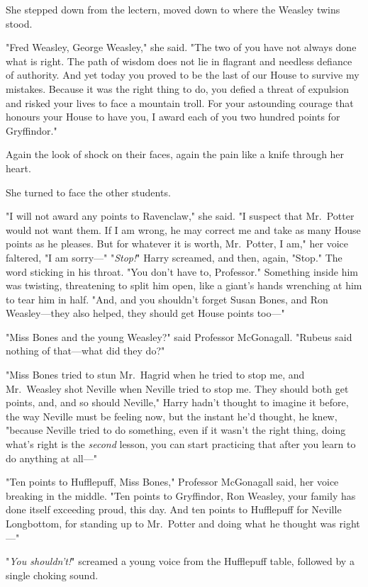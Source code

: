 She stepped down from the lectern, moved down to where the Weasley twins stood.

"Fred Weasley, George Weasley," she said. "The two of you have not always done
what is right. The path of wisdom does not lie in flagrant and needless
defiance of authority. And yet today you proved to be the last of our House to
survive my mistakes. Because it was the right thing to do, you defied a threat
of expulsion and risked your lives to face a mountain troll. For your
astounding courage that honours your House to have you, I award each of you two
hundred points for Gryffindor."

Again the look of shock on their faces, again the pain like a knife through her
heart.

She turned to face the other students.

"I will not award any points to Ravenclaw," she said. "I suspect that
Mr.~Potter would not want them. If I am wrong, he may correct me and take as
many House points as he pleases. But for whatever it is worth, Mr.~Potter, I
am," her voice faltered, "I am sorry---"
\later
"\emph{Stop!}" Harry screamed, and then, again, "Stop." The word sticking in
his throat. "You don't have to, Professor." Something inside him was twisting,
threatening to split him open, like a giant's hands wrenching at him to tear
him in half. "And, and you shouldn't forget Susan Bones, and Ron Weasley---they
also helped, they should get House points too---"

"Miss Bones and the young Weasley?" said Professor McGonagall. "Rubeus said
nothing of that---what did they do?"

"\emph{}Miss Bones tried to stun Mr.~Hagrid when he tried to stop me, and
Mr.~Weasley shot Neville when Neville tried to stop me. They should both get
points, and, and so should Neville," Harry hadn't thought to imagine it before,
the way Neville must be feeling now, but the instant he'd thought, he knew,
"because Neville tried to do something, even if it wasn't the right thing,
doing what's right is the \emph{second} lesson, you can start practicing that
after you learn to do anything at all---"

"Ten points to Hufflepuff, Miss Bones," Professor McGonagall said, her voice
breaking in the middle. "Ten points to Gryffindor, Ron Weasley, your family has
done itself exceeding proud, this day. And ten points to Hufflepuff for Neville
Longbottom, for standing up to Mr.~Potter and doing what he thought was
right---"

"\emph{You shouldn't!}" screamed a young voice from the Hufflepuff table,
followed by a single choking sound.

